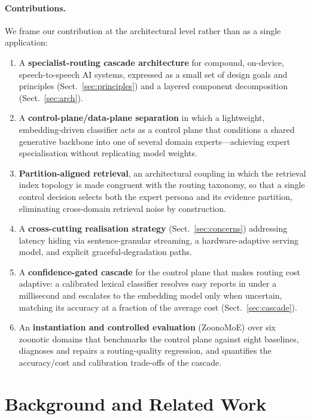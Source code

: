 \documentclass[runningheads]{llncs}
\begin{document}
\paragraph{Contributions.}
We frame our contribution at the architectural level rather than as a single application:

\begin{enumerate}
    \item A \textbf{specialist-routing cascade architecture} for compound, on-device, speech-to-speech AI systems, expressed as a small set of design goals and principles (Sect.~\ref{sec:principles}) and a layered component decomposition (Sect.~\ref{sec:arch}).
    \item A \textbf{control-plane/data-plane separation} in which a lightweight, embedding-driven classifier acts as a control plane that conditions a shared generative backbone into one of several domain experts---achieving expert specialisation without replicating model weights.
    \item \textbf{Partition-aligned retrieval}, an architectural coupling in which the retrieval index topology is made congruent with the routing taxonomy, so that a single control decision selects both the expert persona and its evidence partition, eliminating cross-domain retrieval noise by construction.
    \item A \textbf{cross-cutting realisation strategy} (Sect.~\ref{sec:concerns}) addressing latency hiding via sentence-granular streaming, a hardware-adaptive serving model, and explicit graceful-degradation paths.
    \item A \textbf{confidence-gated cascade} for the control plane that makes routing cost adaptive: a calibrated lexical classifier resolves easy reports in under a millisecond and escalates to the embedding model only when uncertain, matching its accuracy at a fraction of the average cost (Sect.~\ref{sec:cascade}).
    \item An \textbf{instantiation and controlled evaluation} (ZoonoMoE) over six zoonotic domains that benchmarks the control plane against eight baselines, diagnoses and repairs a routing-quality regression, and quantifies the accuracy/cost and calibration trade-offs of the cascade.
\end{enumerate}

\section{Background and Related Work}
\end{document}
